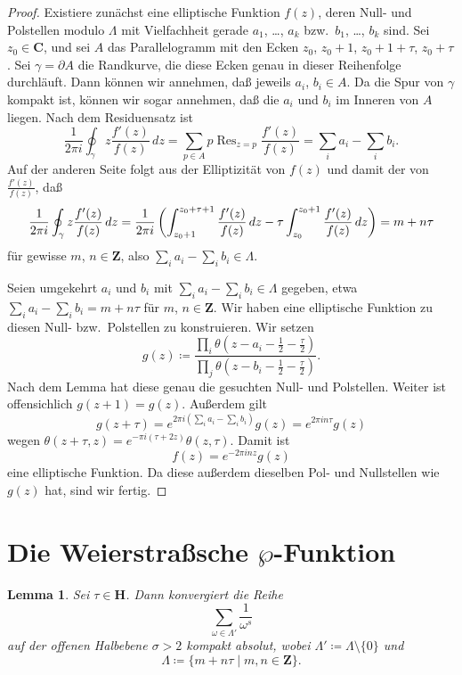 \documentclass[a4paper,twoside,openright]{report}
\newtheorem{lem}[thm]{Lemma}
\theoremstyle{definition}
\theoremstyle{remark}
\DeclareMathOperator{\Res}{Res}
\begin{document}
\begin{proof}
  Existiere zunächst eine elliptische Funktion $f(z)$, deren Null- und Polstellen
  modulo $\Lambda$ mit Vielfachheit gerade $a_1$, \dots, $a_k$ bzw.~$b_1$, \dots,
  $b_k$ sind. Sei $z_0 \in \mathbf C$, und sei $A$ das Parallelogramm mit den
  Ecken $z_0$, $z_0 + 1$, $z_0 + 1 + \tau$, $z_0 + \tau$. Sei $\gamma = \partial A$
  die Randkurve, die diese Ecken genau in dieser Reihenfolge durchläuft. Dann können
  wir annehmen, daß jeweils $a_i$, $b_i \in A$. Da die Spur von $\gamma$ kompakt
  ist, können wir sogar annehmen, daß die $a_i$ und $b_i$ im Inneren von $A$ liegen.
  Nach dem Residuensatz ist
  \[
    \frac 1 {2 \pi i} \oint_\gamma z \frac{f'(z)}{f(z)} \, dz
    = \sum_{p \in A} p \Res_{z = p} \frac{f'(z)}{f(z)}
    = \sum_i a_i - \sum_i b_i.
  \]
  Auf der anderen Seite folgt aus der Elliptizität von $f(z)$ und damit der von
  $\frac{f'(z)}{f(z)}$, daß
  \[
      \frac 1 {2 \pi i} \oint_\gamma z \frac{f'(z)}{f(z)} \, dz \\
      = \frac 1 {2 \pi i} \left(
        \int_{z_0 + 1}^{z_0 + \tau + 1} \frac{f'(z)}{f(z)} \, dz
        - \tau \int_{z_0}^{z_0 + 1} \frac{f'(z)}{f(z)} \, dz
      \right) 
      = m + n \tau
  \]
  für gewisse $m$, $n \in \mathbf Z$, also $\sum_i a_i - \sum_i b_i \in \Lambda$.
  
  Seien umgekehrt $a_i$ und $b_i$ mit $\sum_i a_i - \sum_i b_i \in \Lambda$
  gegeben, etwa $\sum_i a_i - \sum_i b_i = m + n \tau$ für $m$, $n \in \mathbf Z$.
  Wir haben eine elliptische Funktion zu diesen Null- bzw.~Polstellen
  zu konstruieren. Wir setzen
  \[
    g(z) \coloneqq \frac{\prod_i\theta(z - a_i - \frac 1 2 - \frac\tau 2)}{\prod_j\theta(z - b_i - \frac 1 2 - \frac \tau 2)}.
  \]
  Nach dem Lemma hat diese genau die gesuchten Null- und Polstellen. Weiter ist
  offensichlich $g(z + 1) = g(z)$. Außerdem gilt
  \[
    g(z + \tau) = e^{2\pi i(\sum_i a_i - \sum_i b_i)} g(z) = e^{2 \pi i n \tau} g(z)
  \]
  wegen $\theta(z + \tau, z) = e^{- \pi i(\tau + 2 z)}\theta(z, \tau)$.
  Damit ist
  \[
    f(z) = e^{-2\pi i n z} g(z)
  \]
  eine elliptische Funktion. Da diese außerdem dieselben Pol- und Nullstellen wie $g(z)$
  hat, sind wir fertig.
\end{proof}

\section{Die Weierstraßsche $\wp$-Funktion}

\begin{lem}
  Sei $\tau \in \mathbf H$. Dann konvergiert die Reihe
  \[
    \sum_{\omega \in \Lambda'} \frac{1}{\omega^s}
  \]
  auf der offenen Halbebene $\sigma > 2$ kompakt absolut, wobei
  $\Lambda' \coloneqq \Lambda \setminus \{0\}$ und
  \[
    \Lambda \coloneqq \{m + n \tau \mid m, n \in \mathbf Z\}.
  \]
\end{lem}
\end{document}
